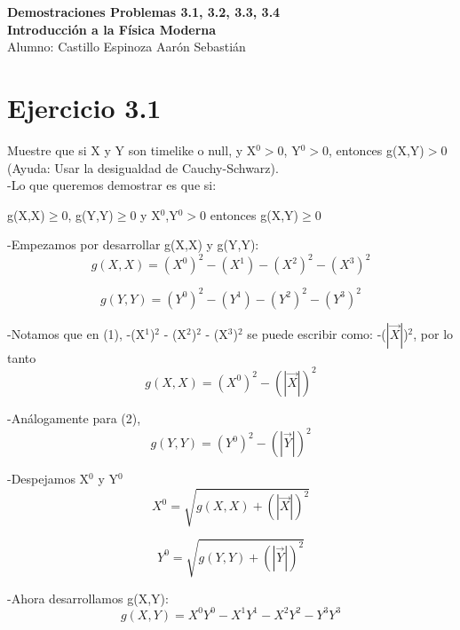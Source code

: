 \documentclass[a4paper, 11pt]{article}
\begin{document}
\noindent
\large\textbf{Demostraciones Problemas 3.1, 3.2, 3.3, 3.4} \\
\textbf{Introducción a la Física Moderna} \\
\normalsize 
Alumno: Castillo Espinoza Aarón Sebastián
 

\section*{Ejercicio 3.1}
Muestre que si X y Y son timelike o null, y X$^{0}>$0, Y$^{0}>$0, entonces g(X,Y)$>$0 (Ayuda: Usar la desigualdad de Cauchy-Schwarz).\\

-Lo que queremos demostrar es que si: 
\begin{center}
    g(X,X)$\geq$0, g(Y,Y)$\geq$0 y X$^{0}$,Y$^{0}>$0 entonces
    g(X,Y)$\geq$0
\end{center}

-Empezamos por desarrollar g(X,X) y g(Y,Y):
\begin{equation} g(X,X)=(X^{0})^2 - (X^{1}) - (X^{2})^2 - (X^{3})^2
\end{equation}

\begin{equation} g(Y,Y)=(Y^{0})^2 - (Y^{1}) - (Y^{2})^2 - (Y^{3})^2
\end{equation}
        
-Notamos que en (1), -(X$^{1}$)$^2$ - (X$^{2}$)$^2$ - (X$^{3}$)$^2$ se puede escribir como: -($|\vec{X}|$)$^2$, por lo tanto \begin{equation}
    g(X,X)=(X^{0})^2 - (|\vec{X}|)^2
\end{equation} 

-Análogamente para (2),
\begin{equation}
    g(Y,Y)=(Y^{0})^2 - (|\vec{Y}|)^2
\end{equation}

-Despejamos X$^{0}$ y Y$^{0}$
\begin{equation}
    X^{0}=\sqrt{g(X,X)+(|\vec{X}|)^2}
\end{equation}

\begin{equation}
    Y^{0}=\sqrt{g(Y,Y)+(|\vec{Y}|)^2}
\end{equation}

-Ahora desarrollamos g(X,Y):
\begin{equation}
    g(X,Y)=X^{0}Y^{0} - X^{1}Y^{1} - X^{2}Y^{2} - Y^{3}Y^{3}
\end{equation}
\end{document}
